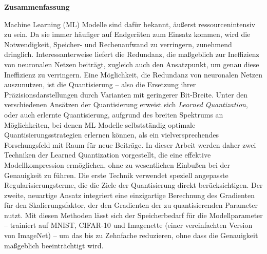 \thispagestyle{empty}
\vspace*{0.2cm}

\begin{center}
    \textbf{Zusammenfassung} \label{zusammenfassung}
\end{center}

\vspace*{0.2cm}

\noindent 
Machine Learning (ML) Modelle sind dafür bekannt,
äußerst ressourcenintensiv zu sein.
Da sie immer häufiger auf Endgeräten zum Einsatz kommen,
wird die Notwendigkeit, Speicher- und Rechenaufwand zu verringern, zunehmend dringlich.
Interessanterweise liefert die Redundanz,
die maßgeblich zur Ineffizienz von neuronalen Netzen beiträgt,
zugleich auch den Ansatzpunkt, um genau diese Ineffizienz zu verringern.
Eine Möglichkeit, die Redundanz von neuronalen Netzen auszunutzen,
ist die Quantisierung –
also die Ersetzung ihrer Präzisionsdarstellungen durch Varianten mit geringerer Bit-Breite.
Unter den verschiedenen Ansätzen der Quantisierung erweist sich
\textit{Learned Quantization}, oder auch erlernte Quantisierung, 
aufgrund des breiten Spektrums an Möglichkeiten,
bei denen ML Modelle selbstständig optimale Quantisierungsstrategien erlernen können,
als ein vielversprechendes Forschungsfeld mit Raum für neue Beiträge.
In dieser Arbeit werden daher zwei Techniken der Learned Quantization vorgestellt,
die eine effektive Modellkompression ermöglichen,
ohne zu wesentlichen Einbußen bei der Genauigkeit zu führen. 
Die erste Technik verwendet speziell angepasste Regularisierungsterme, 
die die Ziele der Quantisierung direkt berücksichtigen. 
Der zweite, neuartige Ansatz integriert eine einzigartige Berechnung des 
Gradienten für den Skalierungsfaktor, 
der den Gradienten der zu quantisierenden Parameter nutzt.
Mit diesen Methoden lässt sich der Speicherbedarf für die Modellparameter
– trainiert auf MNIST, CIFAR-10 und Imagenette
(einer vereinfachten Version von ImageNet)
– um das bis zu Zehnfache reduzieren,
ohne dass die Genauigkeit maßgeblich beeinträchtigt wird.